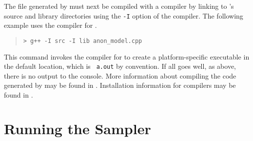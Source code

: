 The file generated by \stanc must next be compiled with a \Cpp
compiler by linking to \Stan's source and library directories using
the {\tt -I} option of the compiler.  The following example 
uses the \clang compiler for \Cpp.
%
\begin{quote}
\begin{Verbatim}[fontshape=sl]
> g++ -I src -I lib anon_model.cpp 
\end{Verbatim}
\end{quote}
%
This command invokes the \clang compiler for \Cpp to create a
platform-specific executable in the default location, which is {\tt
  a.out} by convention.  If all goes well, as above, there is no
output to the console.  More information about compiling the \Cpp code
generated by \Stan may be found in .
Installation information for \Cpp compilers may be found in
.

\section{Running the Sampler}

